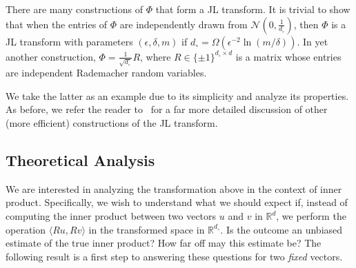 There are many constructions of $\Phi$ that form a JL transform.
It is trivial to show that when the entries of $\Phi$ are independently drawn from
$\mathcal{N}(0, \frac{1}{d_\circ})$, then $\Phi$ is a JL transform with parameters
$(\epsilon, \delta, m)$ if $d_\circ = \Omega(\epsilon^{-2} \ln (m / \delta))$.
In yet another construction, $\Phi=\frac{1}{\sqrt{d_\circ}} R$, where
$R \in \{ \pm 1 \}^{d_\circ \times d}$ is a matrix whose entries are independent Rademacher random variables.

We take the latter as an example due to its simplicity and analyze its properties.
As before, we refer the reader to~\citep{woodruff2014sketching} for a far more
detailed discussion of other (more efficient) constructions of the JL transform.

\subsection{Theoretical Analysis}
We are interested in analyzing the transformation above in the context of inner product.
Specifically, we wish to understand what we should expect if, instead of computing
the inner product between two vectors $u$ and $v$ in $\mathbb{R}^d$, we perform
the operation $\langle Ru, Rv \rangle$ in the transformed space in $\mathbb{R}^{d_\circ}$.
Is the outcome an unbiased estimate of the true inner product? How far off may this estimate be?
The following result is a first step to answering these questions for two \emph{fixed} vectors.

